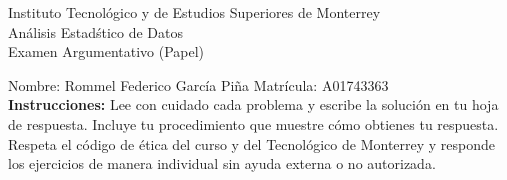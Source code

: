 \documentclass[10pt]{report}
\begin{document}
\newpage



\begin{center}
{\large Instituto Tecnol\'{o}gico y de Estudios Superiores de Monterrey \\
An\'alisis Estad\'stico de Datos } \\
Examen Argumentativo (Papel)
\end{center}

Nombre: \underline{\hspace*{.2in}}
Rommel Federico Garc\'ia Pi\~na
\underline{\hspace*{.2in}} \quad Matr\'icula:\underline{\hspace*{.2in}}
A01743363
\underline{\hspace*{.2in}} \\

{\bf Instrucciones:} Lee con cuidado cada problema y escribe la soluci\'on
en tu hoja de respuesta. Incluye tu procedimiento que muestre c\'omo obtienes tu respuesta.  Respeta el c\'odigo de \'etica del curso y del Tecnol\'ogico de Monterrey y responde los ejercicios de manera individual sin ayuda externa o no autorizada.
\end{document}
